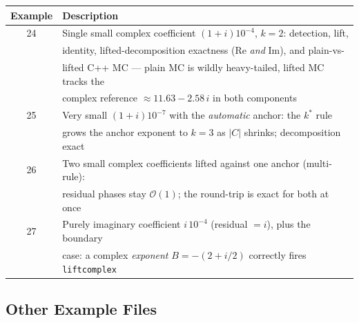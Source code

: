 \documentclass[11pt,a4paper]{article}
\begin{document}
\begin{center}
\begin{tabular}{cl}
\toprule
\textbf{Example} & \textbf{Description} \\
\midrule
24 & Single small complex coefficient $(1{+}i)10^{-4}$, $k=2$: detection, lift, \\
   & identity, lifted-decomposition exactness (Re \emph{and} Im), and plain-vs- \\
   & lifted C++ MC --- plain MC is wildly heavy-tailed, lifted MC tracks the \\
   & complex reference $\approx 11.63 - 2.58\,i$ in both components \\
25 & Very small $(1{+}i)10^{-7}$ with the \emph{automatic} anchor: the $k^{*}$ rule \\
   & grows the anchor exponent to $k=3$ as $|C|$ shrinks; decomposition exact \\
26 & Two small complex coefficients lifted against one anchor (multi-rule): \\
   & residual phases stay $\mathcal{O}(1)$; the round-trip is exact for both at once \\
27 & Purely imaginary coefficient $i\,10^{-4}$ (residual $= i$), plus the boundary \\
   & case: a complex \emph{exponent} $B = -(2{+}i/2)$ correctly fires \texttt{liftcomplex} \\
\bottomrule
\end{tabular}
\end{center}

\subsection*{Other Example Files}
\end{document}
